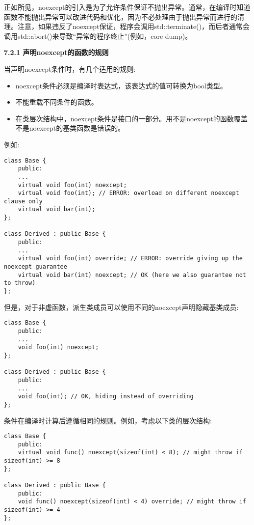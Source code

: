 正如所见，noexcept的引入是为了允许条件保证不抛出异常。通常，在编译时知道函数不能抛出异常可以改进代码和优化，因为不必处理由于抛出异常而进行的清理。注意，如果违反了noexcept保证，程序会调用std::terminate()，而后者通常会调用std::abort()来导致“异常的程序终止”(例如，core dump)。\par

\hspace*{\fill} \par %
\textbf{7.2.1 声明noexcept的函数的规则}

当声明noexcept条件时，有几个适用的规则:\par

\begin{itemize}
	\item noexcept条件必须是编译时表达式，该表达式的值可转换为bool类型。
	\item 不能重载不同条件的函数。
	\item 在类层次结构中，noexcept条件是接口的一部分。用不是noexcept的函数覆盖不是noexcept的基类函数是错误的。
\end{itemize}

例如:\par

\begin{lstlisting}[caption={}]
class Base {
	public:
	...
	virtual void foo(int) noexcept;
	virtual void foo(int); // ERROR: overload on different noexcept clause only
	virtual void bar(int);
};

class Derived : public Base {
	public:
	...
	virtual void foo(int) override; // ERROR: override giving up the noexcept guarantee
	virtual void bar(int) noexcept; // OK (here we also guarantee not to throw)
};
\end{lstlisting}

但是，对于非虚函数，派生类成员可以使用不同的noexcept声明隐藏基类成员:\par

\begin{lstlisting}[caption={}]
class Base {
	public:
	...
	void foo(int) noexcept;
};

class Derived : public Base {
	public:
	...
	void foo(int); // OK, hiding instead of overriding
};
\end{lstlisting}

条件在编译时计算后遵循相同的规则。例如，考虑以下类的层次结构:\par

\begin{lstlisting}[caption={}]
class Base {
	public:
	virtual void func() noexcept(sizeof(int) < 8); // might throw if sizeof(int) >= 8
};

class Derived : public Base {
	public:
	void func() noexcept(sizeof(int) < 4) override; // might throw if sizeof(int) >= 4
};
\end{lstlisting}

